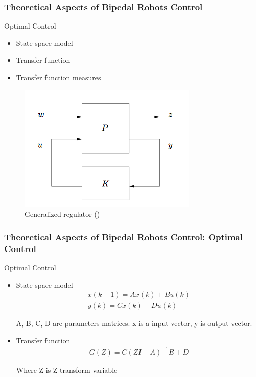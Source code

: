 \documentclass{beamer}
\begin{document}

	\begin{frame}
		\frametitle{Theoretical Aspects of Bipedal Robots Control}
		\begin{block}{Optimal Control}
			\begin{itemize}
				\item
				State space model
				\item
				Transfer function
				\item
				Transfer function measures
			\end{itemize}
		\end{block}
		
		\begin{figure}[h!]
			\includegraphics[width=0.5\linewidth]{presentation_images/15}
			\caption{Generalized regulator (\cite{hazell2008discrete})}
		\end{figure}
	\end{frame}
	
	
	\begin{frame}
		\frametitle{Theoretical Aspects of Bipedal Robots Control: Optimal Control}
		\begin{block}{Optimal Control}
			\begin{itemize}
				\item
				State space model
				\begin{equation}
				\begin{split}
				x(k+1) = Ax(k) + Bu(k)\\
				y(k) = Cx(k) + Du(k)
				\end{split}
				\end{equation}
				
				A, B, C, D are parameters matrices.
				x is a input vector, y is output vector.
				\item
				Transfer function
				\begin{equation}
				\begin{split}
				G(Z) = C(ZI - A)^{-1} B + D
				\end{split}
				\end{equation}
				
				Where Z is Z transform variable
			\end{itemize}
		\end{block}
	\end{frame}
	
\end{document}
